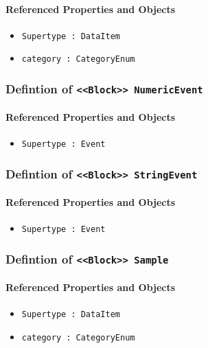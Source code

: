 \FloatBarrier
\paragraph{Referenced Properties and Objects}

\begin{itemize}
\item \texttt{Supertype : DataItem}

\item \texttt{category : CategoryEnum}

\end{itemize}
\FloatBarrier
\subsubsection{Defintion of \texttt{<<Block>> NumericEvent}}
  \label{type:NumericEvent}

\FloatBarrier



\FloatBarrier
\paragraph{Referenced Properties and Objects}

\begin{itemize}
\item \texttt{Supertype : Event}

\end{itemize}
\FloatBarrier
\subsubsection{Defintion of \texttt{<<Block>> StringEvent}}
  \label{type:StringEvent}

\FloatBarrier



\FloatBarrier
\paragraph{Referenced Properties and Objects}

\begin{itemize}
\item \texttt{Supertype : Event}

\end{itemize}
\FloatBarrier
\subsubsection{Defintion of \texttt{<<Block>> Sample}}
  \label{type:Sample}

\FloatBarrier



\FloatBarrier
\paragraph{Referenced Properties and Objects}

\begin{itemize}
\item \texttt{Supertype : DataItem}

\item \texttt{category : CategoryEnum}

\end{itemize}
\FloatBarrier
